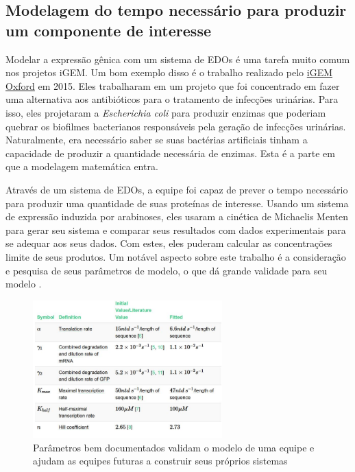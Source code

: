 \documentclass[11pt, letterpaper, portuguese]{article}
\begin{document}
\subsection{Modelagem do tempo necessário para produzir um componente de 
interesse
}
\par {Modelar a expressão gênica com um sistema de EDOs é uma tarefa muito comum nos projetos iGEM. Um bom exemplo disso é o trabalho realizado pelo \href{https://2015.igem.org/Team:Oxford/Modeling#characterising-our-cells}{iGEM Oxford} em 2015. Eles trabalharam em um projeto que foi concentrado em fazer uma alternativa aos antibióticos para o tratamento de infecções urinárias. Para isso, eles projetaram a \textit{Escherichia coli} para produzir enzimas que poderiam quebrar os biofilmes bacterianos responsáveis pela geração de infecções urinárias. Naturalmente, era necessário saber se suas bactérias artificiais tinham a capacidade de produzir a quantidade necessária de enzimas. Esta é a parte em que a modelagem matemática entra.}

\par {Através de um sistema de EDOs, a equipe foi capaz de prever o tempo necessário para produzir uma quantidade de suas proteínas de interesse. Usando um sistema de expressão induzida por arabinoses, eles usaram a cinética de Michaelis Menten para gerar seu sistema e comparar seus resultados com dados experimentais para se adequar aos seus dados. Com estes, eles puderam calcular as concentrações limite de seus produtos. Um notável aspecto sobre este trabalho é a consideração e pesquisa de seus parâmetros de modelo, o que dá grande validade para seu modelo \cite{iGEMOxford_2015}.}

\begin{figure}
	    \centering
		\caption{Parâmetros bem documentados validam o modelo de uma equipe e ajudam as equipes futuras a construir seus próprios sistemas \cite{iGEMOxford_2015}}
		\includegraphics[width=0.65\textwidth]{Tabla parametros.JPG}
	\end{figure}
	\vspace{0.3 cm}
	
\end{document}
